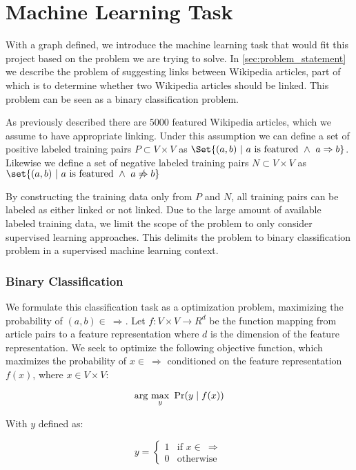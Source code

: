 \section{Machine Learning Task}\label{sec:machine_learning_task}
With a graph defined, we introduce the machine learning task that would fit this project based on the problem we are trying to solve. In \cref{sec:problem_statement} we describe the problem of suggesting links between Wikipedia articles, part of which is to determine whether two Wikipedia articles should be linked. This problem can be seen as a binary classification problem.

As previously described there are $5000$ featured Wikipedia articles, which we assume to have appropriate linking. Under this assumption we can define a set of positive labeled training pairs $P \subset V \times V$ as $\Set{(a,b)\ |\ a\text{ is featured}\ \wedge\ a \Rightarrow b}$. Likewise we define a set of negative labeled training pairs $N \subset V \times V$ as $\set{(a,b)\ |\ a\text{ is featured}\ \wedge\ a \not\Rightarrow b}$

By constructing the training data only from $P$ and $N$, all training pairs can be labeled as either linked or not linked. Due to the large amount of available labeled training data, we limit the scope of the problem to only consider supervised learning approaches. This delimits the problem to binary classification problem in a supervised machine learning context.

\subsubsection{Binary Classification}

We formulate this classification task as a optimization problem, maximizing the probability of $(a,b) \in \ \Rightarrow$. Let $f: V\times V \to R^d$ be the function mapping from article pairs to a feature representation where $d$ is the dimension of the feature representation.
We seek to optimize the following objective function, which maximizes the probability of $x \in \ \Rightarrow$ conditioned on the feature representation $f(x)$, where $x \in V \times V$:

\begin{equation}
\label{objective}
\arg\ \!\max_y\ \Pr(y \mid f(x))
\end{equation}

With $y$ defined as:

\[
    y=
\begin{cases}
    1 & \text{if } x \in \  \Rightarrow\\
    0 & \text{otherwise}
\end{cases}
\]

